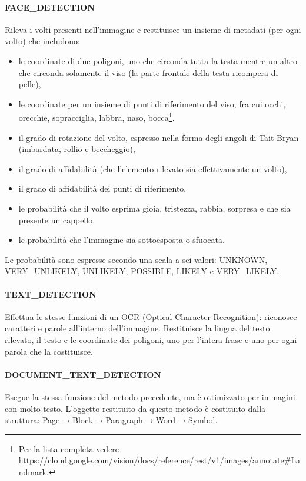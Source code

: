 \paragraph{\textsf{FACE\_DETECTION}} Rileva i volti presenti nell'immagine e restituisce un insieme di metadati (per ogni volto) che includono:
\begin{itemize}
\item le coordinate di due poligoni, uno che circonda tutta la testa mentre un altro che circonda solamente il viso (la parte frontale della testa ricompera di pelle),
\item le coordinate per un insieme di punti di riferimento del viso, fra cui occhi, orecchie, sopracciglia, labbra, naso, bocca\footnote{Per la lista completa vedere \url{https://cloud.google.com/vision/docs/reference/rest/v1/images/annotate\#Landmark}.}.
\item il grado di rotazione del volto, espresso nella forma degli angoli di Tait-Bryan (imbardata, rollio e beccheggio), 
\item il grado di affidabilità (che l'elemento rilevato sia effettivamente un volto),
\item il grado di affidabilità dei punti di riferimento,
\item le probabilità che il volto esprima gioia, tristezza, rabbia, sorpresa e che sia presente un cappello, 
\item le probabilità che l'immagine sia sottoesposta o sfuocata.
\end{itemize}
Le probabilità sono espresse secondo una scala a sei valori: \textsf{UNKNOWN}, \textsf{VERY\_UNLIKELY}, \textsf{UNLIKELY}, \textsf{POSSIBLE}, \textsf{LIKELY} e \textsf{VERY\_LIKELY}.
%
\paragraph{\textsf{TEXT\_DETECTION}} Effettua le stesse funzioni di un OCR (Optical Character Recognition): riconosce caratteri e parole all'interno dell'immagine.
Restituisce la lingua del testo rilevato, il testo e le coordinate dei poligoni, uno per l'intera frase e uno per ogni parola che la costituisce.
%
\paragraph{\textsf{DOCUMENT\_TEXT\_DETECTION}} Esegue la stessa funzione del metodo precedente, ma è ottimizzato per immagini con molto testo.
L'oggetto restituito da questo metodo è costituito dalla struttura: \textsf{Page}$\to$\textsf{Block}$\to$\textsf{Paragraph}$\to$\textsf{Word}$\to$\textsf{Symbol}.


